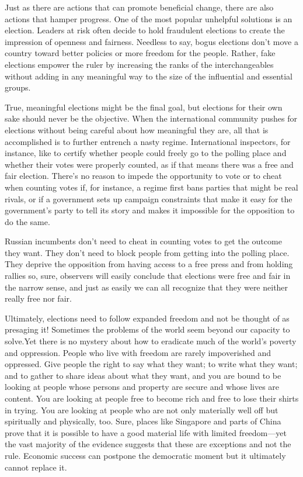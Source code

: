 \documentclass[10pt]{article}
\begin{document}
{\large Just as there are actions that can promote beneficial change, there are
also actions that hamper progress. One of the most popular unhelpful solutions is
an election. Leaders at risk often decide to hold fraudulent elections to create
the impression of openness and fairness. Needless to say, bogus elections don't
move a country toward better policies or more freedom for the people. Rather,
fake elections empower the ruler by increasing the ranks of the interchangeables
without adding in any meaningful way to the size of the influential and essential
groups.}

{\large True, meaningful elections might be the final goal, but elections for
their own sake should never be the objective. When the international community
pushes for elections without being careful about how meaningful they are, all
that is accomplished is to further entrench a nasty regime. International
inspectors, for instance, like to certify whether people could freely go to the
polling place and whether their votes were properly counted, as if that means
there was a free and fair election. There's no reason to impede the opportunity
to vote or to cheat when counting votes if, for instance, a regime first bans
parties that might be real rivals, or if a government sets up campaign
constraints that make it easy for the government's party to tell its story and
makes it impossible for the opposition to do the same.}

{\large Russian incumbents don't need to cheat in counting votes to get the
outcome they want. They don't need to block people from getting into the polling
place. They deprive the opposition from having access to a free press and from
holding rallies so, sure, observers will easily conclude that elections were free
and fair in the narrow sense, and just as easily we can all recognize that they
were neither really free nor fair.}

{\large Ultimately, elections need to follow expanded freedom and not be thought
of as presaging it! Sometimes the problems of the world seem beyond our capacity
to solve.Yet there is no mystery about how to eradicate much of the world's
poverty and oppression. People who live with freedom are rarely impoverished and
oppressed. Give people the right to say what they want; to write what they want;
and to gather to share ideas about what they want, and you are bound to be
looking at people whose persons and property are secure and whose lives are
content. You are looking at people free to become rich and free to lose their
shirts in trying. You are looking at people who are not only materially well off
but spiritually and physically, too. Sure, places like Singapore and parts of
China prove that it is possible to have a good material life with limited
freedom---yet the vast majority of the evidence suggests that these are
exceptions and not the rule. Economic success can postpone the democratic moment
but it ultimately cannot replace it.}
\end{document}
